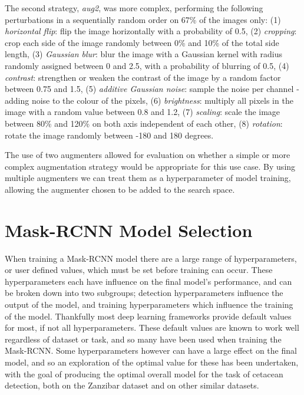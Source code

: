 The second strategy, \textit{aug2}, was more complex, performing the following perturbations in a sequentially random order on 67\% of the images only: (1) \textit{horizontal flip}: flip the image horizontally with a probability of 0.5, (2) \textit{cropping}: crop each side of the image randomly between 0\% and 10\% of the total side length, (3) \textit{Gaussian blur}: blur the image with a Gaussian kernel with radius randomly assigned between 0 and 2.5, with a probability of blurring of 0.5, (4) \textit{contrast}: strengthen or weaken the contrast of the image by a random factor between 0.75 and 1.5, (5) \textit{additive Gaussian noise}: sample the noise per channel - adding noise to the colour of the pixels, (6) \textit{brightness}: multiply all pixels in the image with a random value between 0.8 and 1.2, (7) \textit{scaling}: scale the image between 80\% and 120\% on both axis independent of each other, (8) \textit{rotation}: rotate the image randomly between -180 and 180 degrees. 

The use of two augmenters allowed for evaluation on whether a simple or more complex augmentation strategy would be appropriate for this use case. By using multiple augmenters we can treat them as a hyperparameter of model training, allowing the augmenter chosen to be added to the search space.

\section{Mask-RCNN Model Selection}\label{ch:cetDet,sec:ModelSelection}

When training a Mask-RCNN model there are a large range of hyperparameters, or user defined values, which must be set before training can occur. These hyperparameters each have influence on the final model's performance, and can be broken down into two subgroups; detection hyperparameters influence the output of the model, and training hyperparameters which influence the training of the model. Thankfully most deep learning frameworks provide default values for most, if not all hyperparameters. These default values are known to work well regardless of dataset or task, and so many have been used when training the Mask-RCNN. Some hyperparameters however can have a large effect on the final model, and so an exploration of the optimal value for these has been undertaken, with the goal of producing the optimal overall model for the task of cetacean detection, both on the Zanzibar dataset and on other similar datasets. 

